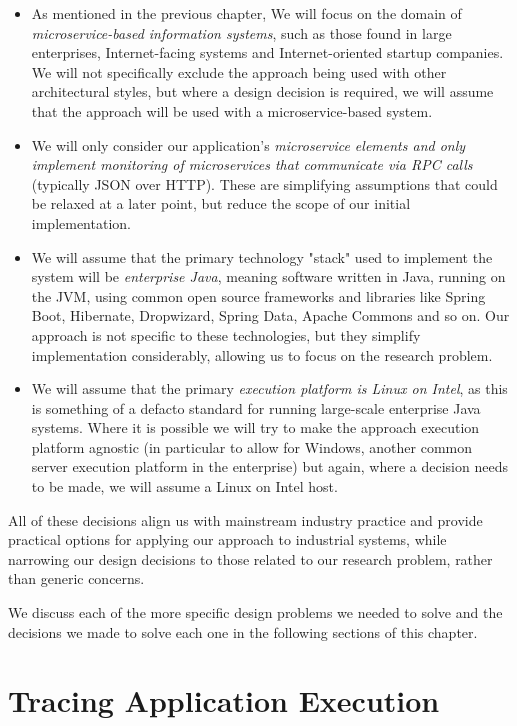 \begin{itemize}
	\item As mentioned in the previous chapter, We will focus on the domain of \emph{microservice-based information systems}, such as those found in large enterprises, Internet-facing systems and Internet-oriented startup companies.  We will not specifically exclude the approach being used with other architectural styles, but where a design decision is required, we will assume that the approach will be used with a microservice-based system.
	\item We will only consider our application's \emph{microservice elements and only implement monitoring of microservices that communicate via RPC calls} (typically JSON over HTTP).  These are simplifying assumptions that could be relaxed at a later point, but reduce the scope of our initial implementation.
	\item We will assume that the primary technology "stack" used to implement the system will be \emph{enterprise Java}, meaning software written in Java, running on the JVM, using common open source frameworks and libraries like Spring Boot, Hibernate, Dropwizard, Spring Data, Apache Commons and so on.  Our approach is not specific to these technologies, but they simplify implementation considerably, allowing us to focus on the research problem.
	\item We will assume that the primary \emph{execution platform is Linux on Intel}, as this is something of a defacto standard for running large-scale enterprise Java systems.  Where it is possible we will try to make the approach execution platform agnostic (in particular to allow for Windows, another common server execution platform in the enterprise) but again, where a decision needs to be made, we will assume a Linux on Intel host.
\end{itemize}

All of these decisions align us with mainstream industry practice and provide practical options for applying our approach to industrial systems, while narrowing our design decisions to those related to our research problem, rather than generic concerns.

We discuss each of the more specific design problems we needed to solve and the decisions we made to solve each one in the following sections of this chapter.

\section{Tracing Application Execution}

